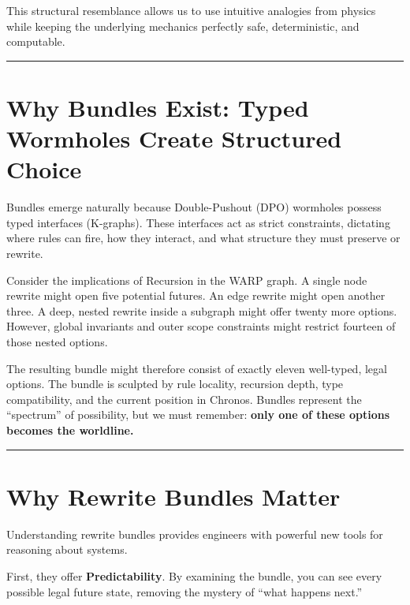 This structural resemblance allows us to use intuitive analogies from physics while keeping the underlying mechanics perfectly safe, deterministic, and computable.

\begin{center}\rule{0.5\linewidth}{0.5pt}\end{center}

\section{\texorpdfstring{\textbf{Why Bundles Exist: Typed Wormholes Create Structured Choice}}{11.4 --- Why Bundles Exist: Typed Wormholes Create Structured Choice}}

Bundles emerge naturally because Double-Pushout (DPO) wormholes possess typed interfaces (K-graphs). These interfaces act as strict constraints, dictating where rules can fire, how they interact, and what structure they must preserve or rewrite.

Consider the implications of Recursion in the WARP graph. A single node rewrite might open five potential futures. An edge rewrite might open another three. A deep, nested rewrite inside a subgraph might offer twenty more options. However, global invariants and outer scope constraints might restrict fourteen of those nested options.

The resulting bundle might therefore consist of exactly eleven well-typed, legal options. The bundle is sculpted by rule locality, recursion depth, type compatibility, and the current position in Chronos. Bundles represent the ``spectrum'' of possibility, but we must remember: \textbf{only one of these options becomes the worldline.}

\begin{center}\rule{0.5\linewidth}{0.5pt}\end{center}

\section{\texorpdfstring{\textbf{Why Rewrite Bundles Matter}}{11.5 --- Why Rewrite Bundles Matter}}

Understanding rewrite bundles provides engineers with powerful new tools for reasoning about systems.

First, they offer \textbf{Predictability}. By examining the bundle, you can see every possible legal future state, removing the mystery of ``what happens next.''

